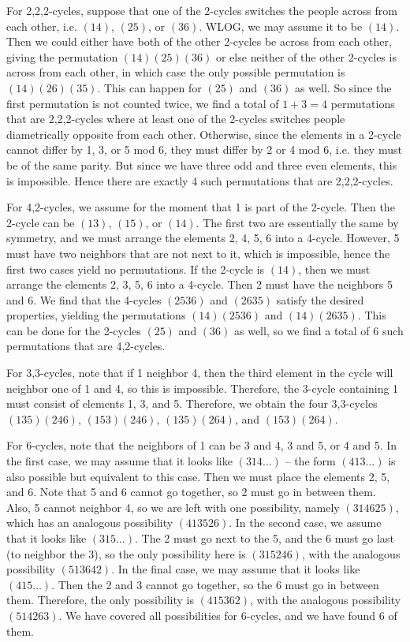 \begin{enumerate}
 For 2,2,2-cycles, suppose that one of the 2-cycles switches the people across from each other, i.e. $(14)$, $(25)$, or $(36)$. WLOG, we may assume it to be $(14)$. Then we could either have both of the other 2-cycles be across from each other, giving the permutation $(14)(25)(36)$ or else neither of the other 2-cycles is across from each other, in which case the only possible permutation is $(14)(26)(35)$. This can happen for $(25)$ and $(36)$ as well. So since the first permutation is not counted twice, we find a total of $1+3=4$ permutations that are 2,2,2-cycles where at least one of the 2-cycles switches people diametrically opposite from each other. Otherwise, since the elements in a 2-cycle cannot differ by 1, 3, or 5 mod 6, they must differ by 2 or 4 mod 6, i.e. they must be of the same parity. But since we have three odd and three even elements, this is impossible. Hence there are exactly 4 such permutations that are 2,2,2-cycles.

 For 4,2-cycles, we assume for the moment that 1 is part of the 2-cycle. Then the 2-cycle can be $(13)$, $(15)$, or $(14)$. The first two are essentially the same by symmetry, and we must arrange the elements 2, 4, 5, 6 into a 4-cycle. However, 5 must have two neighbors that are not next to it, which is impossible, hence the first two cases yield no permutations. If the 2-cycle is $(14)$, then we must arrange the elements 2, 3, 5, 6 into a 4-cycle. Then 2 must have the neighbors 5 and 6. We find that the 4-cycles $(2536)$ and $(2635)$ satisfy the desired properties, yielding the permutations $(14)(2536)$ and $(14)(2635)$. This can be done for the 2-cycles $(25)$ and $(36)$ as well, so we find a total of 6 such permutations that are 4,2-cycles.

 For 3,3-cycles, note that if 1 neighbor 4, then the third element in the cycle will neighbor one of 1 and 4, so this is impossible. Therefore, the 3-cycle containing 1 must consist of elements 1, 3, and 5. Therefore, we obtain the four 3,3-cycles $(135)(246)$, $(153)(246)$, $(135)(264)$, and $(153)(264)$.

 For 6-cycles, note that the neighbors of 1 can be 3 and 4, 3 and 5, or 4 and 5. In the first case, we may assume that it looks like $(314\dots)$ -- the form $(413\dots)$ is also possible but equivalent to this case. Then we must place the elements 2, 5, and 6. Note that 5 and 6 cannot go together, so 2 must go in between them. Also, 5 cannot neighbor 4, so we are left with one possibility, namely $(314625)$, which has an analogous possibility $(413526)$. In the second case, we assume that it looks like $(315\dots)$. The 2 must go next to the 5, and the 6 must go last (to neighbor the 3), so the only possibility here is $(315246)$, with the analogous possibility $(513642)$. In the final case, we may assume that it looks like $(415\dots)$. Then the 2 and 3 cannot go together, so the 6 must go in between them. Therefore, the only possibility is $(415362)$, with the analogous possibility $(514263)$. We have covered all possibilities for 6-cycles, and we have found 6 of them.


\end{enumerate}
